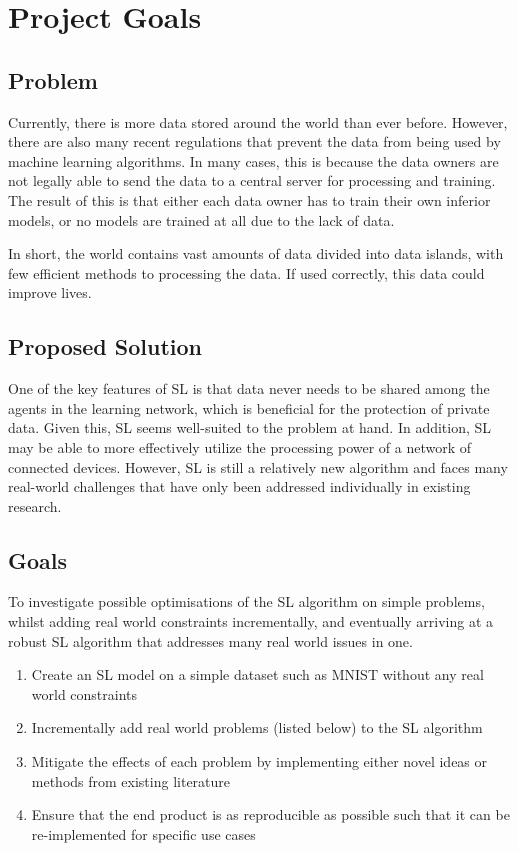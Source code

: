 \chapter{Project Goals}
\section{Problem}
Currently, there is more data stored around the world than ever before. However, there are also many recent regulations that prevent the data from being used by machine learning algorithms. In many cases, this is because the data owners are not legally able to send the data to a central server for processing and training. The result of this is that either each data owner has to train their own inferior models, or no models are trained at all due to the lack of data.

In short, the world contains vast amounts of data divided into data islands, with few efficient methods to processing the data. If used correctly, this data could improve lives.

\section{Proposed Solution}
One of the key features of SL is that data never needs to be shared among the agents in the learning network, which is beneficial for the protection of private data. Given this, SL seems well-suited to the problem at hand. In addition, SL may be able to more effectively utilize the processing power of a network of connected devices. However, SL is still a relatively new algorithm and faces many real-world challenges that have only been addressed individually in existing research.

\section{Goals}
To investigate possible optimisations of the SL algorithm on simple problems, whilst adding real world constraints incrementally, and eventually arriving at a robust SL algorithm that addresses many real world issues in one.

\begin{enumerate}
	\item Create an SL model on a simple dataset such as MNIST without any real world constraints
	\item Incrementally add real world problems (listed below) to the SL algorithm
	\item Mitigate the effects of each problem by implementing either novel ideas or methods from existing literature
	\item Ensure that the end product is as reproducible as possible such that it can be re-implemented for specific use cases
\end{enumerate}

